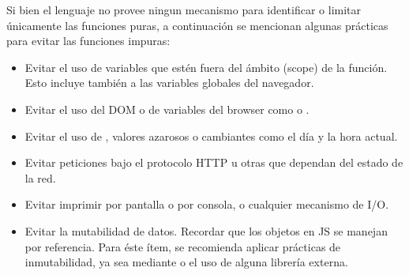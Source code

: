 Si bien el lenguaje no provee ningun mecanismo para identificar o limitar únicamente las funciones puras, a continuación se mencionan algunas prácticas para evitar las funciones impuras:

\begin{itemize}
  \item Evitar el uso de variables que estén fuera del ámbito (scope) de la función. Esto incluye también a las variables globales del navegador.
  \item Evitar el uso del DOM o de variables del browser como  o .
	\item Evitar el uso de , valores azarosos o cambiantes como el día y la hora actual.
	\item Evitar peticiones bajo el protocolo HTTP u otras que dependan del estado de la red.
	\item Evitar imprimir por pantalla o por consola, o cualquier mecanismo de I/O.
	\item Evitar la mutabilidad de datos. Recordar que los objetos en JS se manejan por referencia. Para éste ítem, se recomienda aplicar prácticas de inmutabilidad, ya sea mediante  o el uso de alguna librería externa.
\end{itemize}
